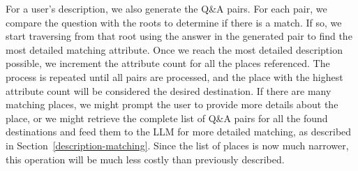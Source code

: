 For a user's description, we also generate the Q\&A pairs. For each pair, we compare the question with the roots to determine if there is a match. If so, we start traversing from that root using the answer in the generated pair to find the most detailed matching attribute. Once we reach the most detailed description possible, we increment the attribute count for all the places referenced. The process is repeated until all pairs are processed, and the place with the highest attribute count will be considered the desired destination. If there are many matching places, we might prompt the user to provide more details about the place, or we might retrieve the complete list of Q\&A pairs for all the found destinations and feed them to the LLM for more detailed matching, as described in Section~\ref{description-matching}. Since the list of places is now much narrower, this operation will be much less costly than previously described.

